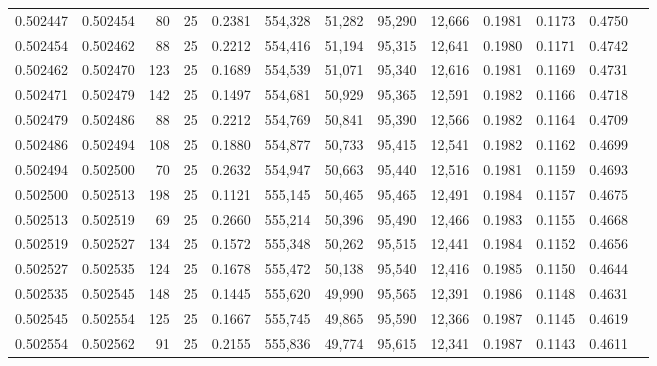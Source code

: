 \begin{tabular}{rrrrrrrrrrrrr}
0.502447 & 0.502454 &  80 &  25 &                                     0.2381 & 554,328 &  51,282 &  95,290 &  12,666 & 0.1981 & 0.1173 & 0.4750 \\
0.502454 & 0.502462 &  88 &  25 &                                     0.2212 & 554,416 &  51,194 &  95,315 &  12,641 & 0.1980 & 0.1171 & 0.4742 \\
0.502462 & 0.502470 & 123 &  25 &                                     0.1689 & 554,539 &  51,071 &  95,340 &  12,616 & 0.1981 & 0.1169 & 0.4731 \\
0.502471 & 0.502479 & 142 &  25 &                                     0.1497 & 554,681 &  50,929 &  95,365 &  12,591 & 0.1982 & 0.1166 & 0.4718 \\
0.502479 & 0.502486 &  88 &  25 &                                     0.2212 & 554,769 &  50,841 &  95,390 &  12,566 & 0.1982 & 0.1164 & 0.4709 \\
0.502486 & 0.502494 & 108 &  25 &                                     0.1880 & 554,877 &  50,733 &  95,415 &  12,541 & 0.1982 & 0.1162 & 0.4699 \\
0.502494 & 0.502500 &  70 &  25 &                                     0.2632 & 554,947 &  50,663 &  95,440 &  12,516 & 0.1981 & 0.1159 & 0.4693 \\
0.502500 & 0.502513 & 198 &  25 &                                     0.1121 & 555,145 &  50,465 &  95,465 &  12,491 & 0.1984 & 0.1157 & 0.4675 \\
0.502513 & 0.502519 &  69 &  25 &                                     0.2660 & 555,214 &  50,396 &  95,490 &  12,466 & 0.1983 & 0.1155 & 0.4668 \\
0.502519 & 0.502527 & 134 &  25 &                                     0.1572 & 555,348 &  50,262 &  95,515 &  12,441 & 0.1984 & 0.1152 & 0.4656 \\
0.502527 & 0.502535 & 124 &  25 &                                     0.1678 & 555,472 &  50,138 &  95,540 &  12,416 & 0.1985 & 0.1150 & 0.4644 \\
0.502535 & 0.502545 & 148 &  25 &                                     0.1445 & 555,620 &  49,990 &  95,565 &  12,391 & 0.1986 & 0.1148 & 0.4631 \\
0.502545 & 0.502554 & 125 &  25 &                                     0.1667 & 555,745 &  49,865 &  95,590 &  12,366 & 0.1987 & 0.1145 & 0.4619 \\
0.502554 & 0.502562 &  91 &  25 &                                     0.2155 & 555,836 &  49,774 &  95,615 &  12,341 & 0.1987 & 0.1143 & 0.4611 \\

\end{tabular}
